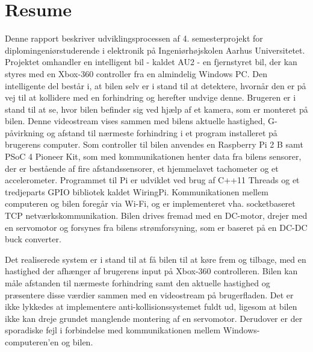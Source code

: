 \chapter{Resume}
\label{ch:Resume}

Denne rapport beskriver udviklingsprocessen af 4. semesterprojekt for diplomingeniørstuderende i elektronik på Ingeniørhøjskolen Aarhus Universitetet. 
Projektet omhandler en intelligent bil - kaldet AU2 - en fjernstyret bil, der kan styres med en Xbox-360 controller\cite{lib:xbox-360} fra en almindelig Windows PC. 
Den intelligente del består i, at bilen selv er i stand til at detektere, hvornår den er på vej til at kollidere med en forhindring og herefter undvige denne. 
Brugeren er i stand til at se, hvor bilen befinder sig ved hjælp af et kamera\cite{lib:cam}, som er monteret på bilen. 
Denne videostream vises sammen med bilens aktuelle hastighed, G-påvirkning og  afstand til nærmeste forhindring i et program installeret på brugerens computer.
Som controller til bilen anvendes en Raspberry Pi 2 B\cite{lib:rpi} samt PSoC 4 Pioneer Kit\cite{lib:psoc4_guide}, som med \IIC kommunikationen henter data fra bilens sensorer, der er bestående af fire afstandssensorer\cite{lib:maxsonar}, et hjemmelavet tachometer og et accelerometer\cite{lib:accel}. 
Programmet til Pi er udviklet ved brug af C++11 Threads\cite{lib:std::Thread} og et tredjeparts GPIO bibliotek kaldet WiringPi\cite{lib:wiringpi}. 
Kommunikationen mellem computeren og bilen foregår via Wi-Fi, og er implementeret vha. socketbaseret TCP netværkskommunikation. 
Bilen drives fremad med en DC-motor, drejer med en servomotor og forsynes fra bilens strømforsyning, som er baseret på en DC-DC buck converter.

Det realiserede system er i stand til at få bilen til at køre frem og tilbage, med en hastighed der afhænger af brugerens input på Xbox-360 controlleren. Bilen kan måle afstanden til nærmeste forhindring samt den aktuelle hastighed og præsentere disse værdier sammen med en videostream på brugerfladen. Det er ikke lykkedes at implementere anti-kollisionssystemet fuldt ud, ligesom at bilen ikke kan dreje grundet manglende montering af en servomotor. Derudover er der sporadiske fejl i forbindelse med kommunikationen mellem Windows-computeren'en og bilen.
\clearpage